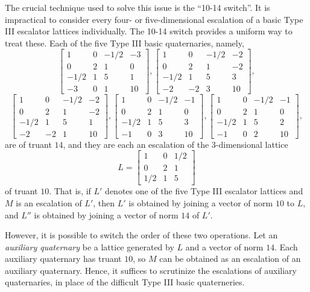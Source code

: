 \documentclass[letterpaper, 12pt]{article}
\begin{document}
The crucial technique used to solve this issue is the ``10-14 switch''.
It is impractical to consider every four- or five-dimensional escalation of a basic Type III escalator lattices individually.
The 10-14 switch provides a uniform way to treat these.
Each of the five Type III basic quaternaries, namely,
\[\begin{bmatrix} 1 & 0 & -1/2 & -3 \\ 0 & 2 & 1 & 0 \\ -1/2 & 1 & 5 & 1 \\ -3 & 0 & 1 & 10 \end{bmatrix}, \begin{bmatrix} 1 & 0 & -1/2 & -2 \\ 0 & 2 & 1 & -2 \\ -1/2 & 1 & 5 & 3 \\ -2 & -2 & 3 & 10 \end{bmatrix},\]
\[\begin{bmatrix} 1 & 0 & -1/2 & -2 \\ 0 & 2 & 1 & -2 \\ -1/2 & 1 & 5 & 1 \\ -2 & -2 & 1 & 10 \end{bmatrix}, \begin{bmatrix} 1 & 0 & -1/2 & -1 \\ 0 & 2 & 1 & 0 \\ -1/2 & 1 & 5 & 3 \\ -1 & 0 & 3 & 10 \end{bmatrix}, \begin{bmatrix} 1 & 0 & -1/2 & -1 \\ 0 & 2 & 1 & 0 \\ -1/2 & 1 & 5 & 2 \\ -1 & 0 & 2 & 10 \end{bmatrix},\]
are of truant $14$, and they are each an escalation of the $3$-dimensional lattice
\[L = \begin{bmatrix} 1 & 0 & 1/2 \\ 0 & 2 & 1 \\ 1/2 & 1 & 5 \end{bmatrix}\]
of truant $10$.
That is, if $L'$ denotes one of the five Type III escalator lattices and $M$ is an escalation of $L'$, then $L'$ is obtained by joining a vector of norm $10$ to $L$, and $L''$ is obtained by joining a vector of norm $14$ of $L'$.

However, it is possible to switch the order of these two operations.
Let an \emph{auxiliary quaternary} be a lattice generated by $L$ and a vector of norm $14$.
Each auxiliary quaternary has truant $10$, so $M$ can be obtained as an escalation of an auxiliary quaternary.
Hence, it suffices to scrutinize the escalations of auxiliary quaternaries, in place of the difficult Type III basic quaterneries.
\end{document}
